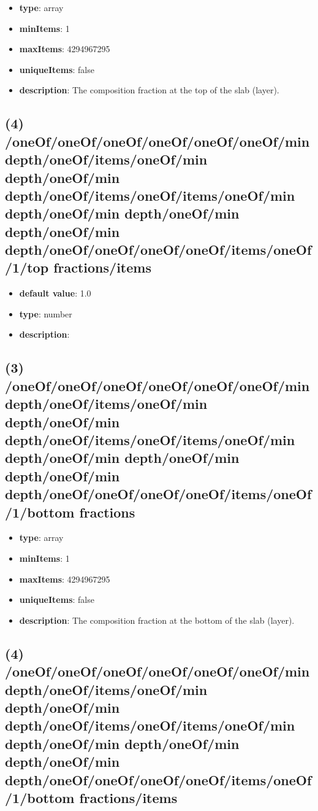 \begin{itemize}[leftmargin=3em]\item {\bf type}: array
\item {\bf minItems}: 1
\item {\bf maxItems}: 4294967295
\item {\bf uniqueItems}: false
\item {\bf description}: The composition fraction at the top of the slab (layer).
\end{itemize}\subsection{(4) /oneOf/oneOf/oneOf/oneOf/oneOf/oneOf/min depth/oneOf/items/oneOf/min depth/oneOf/min depth/oneOf/items/oneOf/items/oneOf/min depth/oneOf/min depth/oneOf/min depth/oneOf/min depth/oneOf/oneOf/oneOf/oneOf/items/oneOf/1/top fractions/items}
\begin{itemize}[leftmargin=4em]\item {\bf default value}: 1.0
\item {\bf type}: number
\item {\bf description}: 
\end{itemize}\subsection{(3) /oneOf/oneOf/oneOf/oneOf/oneOf/oneOf/min depth/oneOf/items/oneOf/min depth/oneOf/min depth/oneOf/items/oneOf/items/oneOf/min depth/oneOf/min depth/oneOf/min depth/oneOf/min depth/oneOf/oneOf/oneOf/oneOf/items/oneOf/1/bottom fractions}
\begin{itemize}[leftmargin=3em]\item {\bf type}: array
\item {\bf minItems}: 1
\item {\bf maxItems}: 4294967295
\item {\bf uniqueItems}: false
\item {\bf description}: The composition fraction at the bottom of the slab (layer).
\end{itemize}\subsection{(4) /oneOf/oneOf/oneOf/oneOf/oneOf/oneOf/min depth/oneOf/items/oneOf/min depth/oneOf/min depth/oneOf/items/oneOf/items/oneOf/min depth/oneOf/min depth/oneOf/min depth/oneOf/min depth/oneOf/oneOf/oneOf/oneOf/items/oneOf/1/bottom fractions/items}
